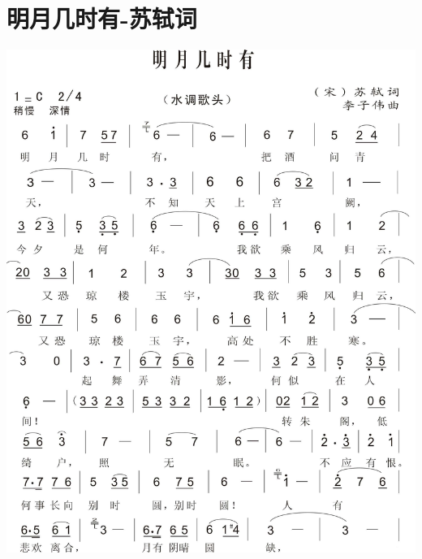 \documentclass[cn,pad,chinese]{elegantbook}
\begin{document}
\section{明月几时有-苏轼词}
    \includegraphics[width=\textwidth]{dongxiao/20200411-明月几时有.jpg}
\end{document}
